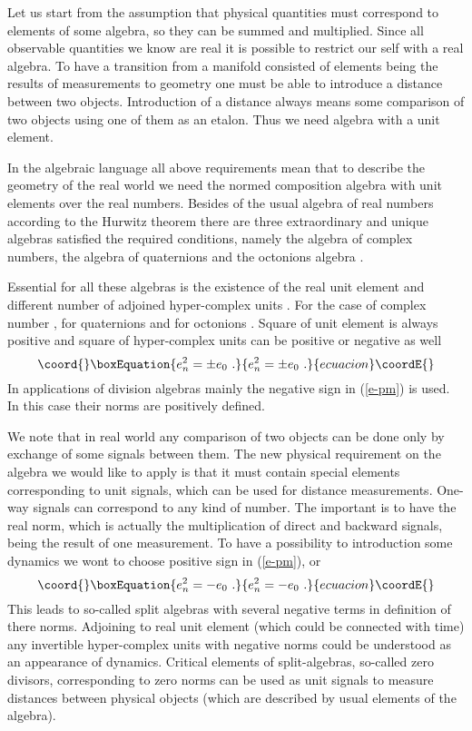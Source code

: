 \documentclass[a4paper,12pt]{article}
\begin{document}
Let us start from the assumption that physical quantities must correspond to 
elements of some algebra, so they can be summed and multiplied. Since all 
observable quantities we know are real it is possible to restrict our self with 
a real algebra. To have a transition from a manifold consisted of elements being 
the results of measurements to geometry one must be able to introduce a distance 
between two objects. Introduction of a distance always means some comparison of 
two objects using one of them as an etalon. Thus we need algebra with a unit 
element. 

In the algebraic language all above requirements mean that to describe the geometry 
of the real world we need the normed composition algebra with unit elements over 
the real numbers. Besides of the usual algebra of real numbers according to the 
Hurwitz theorem there are three extraordinary and unique algebras satisfied the 
required conditions, namely the algebra of complex numbers, the algebra of 
quaternions and the octonions algebra \cite{Sc}. 

Essential for all these algebras is the existence of the real unit element \coordHE{} and 
different number of adjoined hyper-complex units \coordHE{}. For the case of complex number 
\coordHE{}, for quaternions \coordHE{} and for octonions \coordHE{}. Square of unit element 
\coordHE{} is always positive and square of hyper-complex units \coordHE{} can be positive or 
negative as well
\begin{equation}\coord{}\boxEquation{ \label{e-pm}
e_n^2 = \pm e_0 ~.
}{ e_n^2 = \pm e_0 ~.
}{ecuacion}\coordE{}\end{equation}
In applications of division algebras mainly the negative sign in (\ref{e-pm}) is used. 
In this case their norms are positively defined.

We note that in real world any comparison of two objects can be done only by exchange 
of some signals between them. The new physical requirement on the algebra we would 
like to apply is that it must contain special elements corresponding to unit signals, 
which can be used for distance measurements. One-way signals can correspond to any kind 
of number. The important is to have the real norm, which is actually the multiplication 
of direct and backward signals, being the result of one measurement. To have a 
possibility to introduction some dynamics we wont to choose positive sign in (\ref{e-pm}), 
or
\begin{equation}\coord{}\boxEquation{ \label{e-}
e_n^2 = - e_0 ~.
}{ e_n^2 = - e_0 ~.
}{ecuacion}\coordE{}\end{equation}
This leads to so-called split algebras with several negative terms in definition of 
there norms. Adjoining to real unit element (which could be connected with time) any 
invertible hyper-complex units with negative norms could be understood as an appearance 
of dynamics. Critical elements of split-algebras, so-called zero divisors, corresponding 
to zero norms can be used as unit signals to measure distances between physical objects 
(which are described by usual elements of the algebra).
\end{document}
